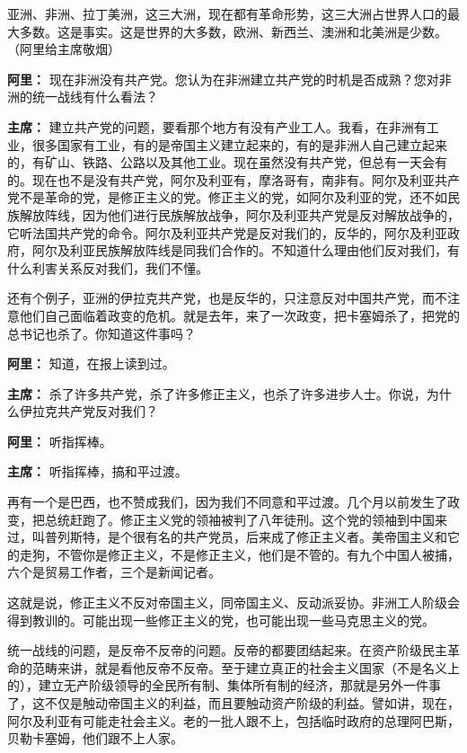 \begin{list}{}
亚洲、非洲、拉丁美洲，这三大洲，现在都有革命形势，这三大洲占世界人口的最大多数。这是事实。这是世界的大多数，欧洲、新西兰、澳洲和北美洲是少数。\\（阿里给主席敬烟）

\item[\textbf{阿里：}] 现在非洲没有共产党。您认为在非洲建立共产党的时机是否成熟？您对非洲的统一战线有什么看法？

\item[\textbf{主席：}] 建立共产党的问题，要看那个地方有没有产业工人。我看，在非洲有工业，很多国家有工业，有的是帝国主义建立起来的，有的是非洲人自己建立起来的，有矿山、铁路、公路以及其他工业。现在虽然没有共产党，但总有一天会有的。现在也不是没有共产党，阿尔及利亚有，摩洛哥有，南非有。阿尔及利亚共产党不是革命的党，是修正主义的党。修正主义的党，如阿尔及利亚的党，还不如民族解放阵线，因为他们进行民族解放战争，阿尔及利亚共产党是反对解放战争的，它听法国共产党的命令。阿尔及利亚共产党是反对我们的，反华的，阿尔及利亚政府，阿尔及利亚民族解放阵线是同我们合作的。不知道什么理由他们反对我们，有什么利害关系反对我们，我们不懂。

还有个例子，亚洲的伊拉克共产党，也是反华的，只注意反对中国共产党，而不注意他们自己面临着政变的危机。就是去年，来了一次政变，把卡塞姆杀了，把党的总书记也杀了。你知道这件事吗？

\item[\textbf{阿里：}] 知道，在报上读到过。

\item[\textbf{主席：}] 杀了许多共产党，杀了许多修正主义，也杀了许多进步人士。你说，为什么伊拉克共产党反对我们？

\item[\textbf{阿里：}] 听指挥棒。

\item[\textbf{主席：}] 听指挥棒，搞和平过渡。

再有一个是巴西，也不赞成我们，因为我们不同意和平过渡。几个月以前发生了政变，把总统赶跑了。修正主义党的领袖被判了八年徒刑。这个党的领袖到中国来过，叫普列斯特，是个很有名的共产党员，后来成了修正主义者。美帝国主义和它的走狗，不管你是修正主义，不是修正主义，他们是不管的。有九个中国人被捕，六个是贸易工作者，三个是新闻记者。

这就是说，修正主义不反对帝国主义，同帝国主义、反动派妥协。非洲工人阶级会得到教训的。可能出现一些修正主义的党，也可能出现一些马克思主义的党。

统一战线的问题，是反帝不反帝的问题。反帝的都要团结起来。在资产阶级民主革命的范畴来讲，就是看他反帝不反帝。至于建立真正的社会主义国家（不是名义上的），建立无产阶级领导的全民所有制、集体所有制的经济，那就是另外一件事了，这不仅是触动帝国主义的利益，而且要触动资产阶级的利益。譬如讲，现在，阿尔及利亚有可能走社会主义。老的一批人跟不上，包括临时政府的总理阿巴斯，贝勒卡塞姆，他们跟不上人家。


\end{list}

